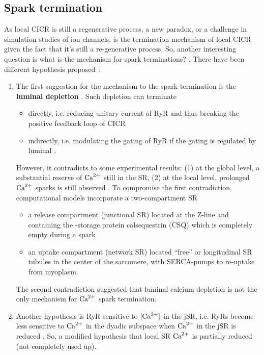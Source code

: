 \subsection{Spark termination}
\label{sec:spark-termination}


As local CICR is still a regenerative process, a new paradox, or a challenge in
simulation studies of ion channels, is the termination mechanism of local CICR
given the fact that it's still a re-generative process.  So, another
interesting question is what is the mechanism for spark terminations?
\citep{stern2004}. There have been different hypothesis
proposed~\citep{stern1992tec}:
\begin{enumerate}
\item The first suggestion for the mechanism to the spark termination
  is the {\bf luminal  depletion} \citep{varro1993, bassani1995fsr,
  negretti1995}. Such depletion can terminate
  \begin{itemize}
  \item directly, i.e. reducing unitary current of RyR and thus breaking
    the positive feedback loop of CICR
  \item indirectly, i.e. modulating the gating of RyR if the gating is
    regulated by luminal . 
  \end{itemize}
  However, it contradicts to some experimental results: (1) at the global
  level, a substantial reserve of ${\text{Ca}^{2+}}$ still in the SR, (2) at the
  local level, prolonged ${\text{Ca}^{2+}}$ sparks is still observed \citep{cheng1993cse}. To
  compromise the first contradiction, computational models
  incorporate a two-compartment SR 
  \begin{itemize}
  \item a release compartment (junctional SR) located at the Z-line and
    containing the -storage protein calsequestrin (CSQ) which is
    completely empty during a spark
  \item an uptake compartment (network SR) located ``free'' or
    longitudinal SR tubules in the center of the sarcomere, with
    SERCA-pumps to re-uptake  from myoplasm. 
  \end{itemize}
  The second contradiction suggested that luminal calcium depletion is not the
  only mechanism for ${\text{Ca}^{2+}}$ spark termination.

\item Another hypothesis is RyR sensitive to $[{\text{Ca}^{2+}}]$ in the jSR, i.e. RyRs
become less sensitive to ${\text{Ca}^{2+}}$ in the dyadic subspace when ${\text{Ca}^{2+}}$ in the jSR is
reduced \citep{thedford1994, lukyanenko1998, gyorke1998, ching2000,
terentyev2002}. So, a modified hypothesis that local SR ${\text{Ca}^{2+}}$ is
  partially reduced (not completely used up).
   

\end{enumerate}
